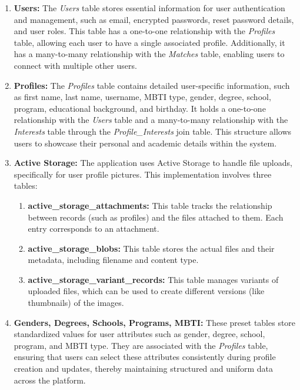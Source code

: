         \begin{enumerate}
            \item \textbf{Users:} The \textit{Users} table stores essential information for user authentication and management, such as email, encrypted passwords, reset password details, and user roles. This table has a one-to-one relationship with the \textit{Profiles} table, allowing each user to have a single associated profile. Additionally, it has a many-to-many relationship with the \textit{Matches} table, enabling users to connect with multiple other users.
        
            \item \textbf{Profiles:} The \textit{Profiles} table contains detailed user-specific information, such as first name, last name, username, MBTI type, gender, degree, school, program, educational background, and birthday. It holds a one-to-one relationship with the \textit{Users} table and a many-to-many relationship with the \textit{Interests} table through the \textit{Profile\_Interests} join table. This structure allows users to showcase their personal and academic details within the system.

            \item \textbf{Active Storage:} The application uses Active Storage to handle file uploads, specifically for user profile pictures. This implementation involves three tables:
                \begin{enumerate}
                    \item \textbf{active\_storage\_attachments:} This table tracks the relationship between records (such as profiles) and the files attached to them. Each entry corresponds to an attachment.
                    \item \textbf{active\_storage\_blobs:} This table stores the actual files and their metadata, including filename and content type.
                    \item \textbf{active\_storage\_variant\_records:} This table manages variants of uploaded files, which can be used to create different versions (like thumbnails) of the images.
                \end{enumerate}
        
            \item \textbf{Genders, Degrees, Schools, Programs, MBTI:} These preset tables store standardized values for user attributes such as gender, degree, school, program, and MBTI type. They are associated with the \textit{Profiles} table, ensuring that users can select these attributes consistently during profile creation and updates, thereby maintaining structured and uniform data across the platform.
        

\end{enumerate}

